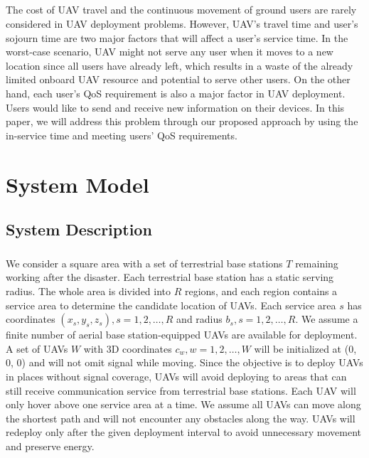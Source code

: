 \documentclass[a4paper,12pt]{report}
\begin{document}
\paragraph{}
The cost of UAV travel and the continuous movement of ground users are rarely considered in UAV deployment problems. However, UAV's travel time and user's sojourn time are two major factors that will affect a user's service time. In the worst-case scenario, UAV might not serve any user when it moves to a new location since all users have already left, which results in a waste of the already limited onboard UAV resource and potential to serve other users. On the other hand, each user's QoS requirement is also a major factor in UAV deployment. Users would like to send and receive new information on their devices. In this paper, we will address this problem through our proposed approach by using the in-service time and meeting users' QoS requirements.


\chapter{System Model}
\section{System Description}
\paragraph{}
We consider a square area with a set of terrestrial base stations $T$ remaining working after the disaster. Each terrestrial base station has a static serving radius. The whole area is divided into $R$ regions, and each region contains a service area to determine the candidate location of UAVs. Each service area $s$ has coordinates $(x_{s},y_{s},z_{s}), s = 1, 2, \ldots, R$ and radius $b_{s}, s = 1, 2, \ldots, R$. We assume a finite number of aerial base station-equipped UAVs are available for deployment. A set of UAVs $W$ with 3D coordinates $c_w, w = 1, 2, \ldots, W$ will be initialized at (0, 0, 0) and will not omit signal while moving. Since the objective is to deploy UAVs in places without signal coverage, UAVs will avoid deploying to areas that can still receive communication service from terrestrial base stations. Each UAV will only hover above one service area at a time. We assume all UAVs can move along the shortest path and will not encounter any obstacles along the way. UAVs will redeploy only after the given deployment interval to avoid unnecessary movement and preserve energy.
\end{document}
